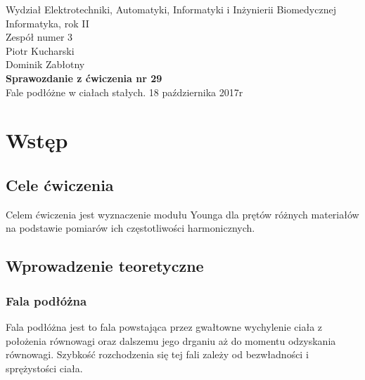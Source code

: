 \documentclass[a4paper,12pts]{article}
\begin{document}
	\thispagestyle{empty}
	\begin{flushleft}
		Wydział Elektrotechniki, Automatyki, Informatyki i Inżynierii Biomedycznej \\
		Informatyka, rok II \\
		Zespół numer 3 \\
		Piotr Kucharski \\
		Dominik Zabłotny \\
		\vspace*{\fill}
		{\large \textbf{Sprawozdanie z ćwiczenia nr 29} } \\
		Fale podłóżne w ciałach stałych.	
		\vfill	
		18 października 2017r
	\end{flushleft}
	
	\newpage
	
	
	\section{Wstęp}
	
	\subsection{Cele ćwiczenia}
	Celem ćwiczenia jest wyznaczenie modułu Younga dla prętów różnych materiałów na podstawie pomiarów ich częstotliwości harmonicznych.
	
	\subsection{Wprowadzenie teoretyczne}
	\subsubsection{Fala podłóżna}
	Fala podłóżna jest to fala powstająca przez gwałtowne wychylenie ciała z położenia równowagi oraz dalszemu jego drganiu aż do momentu odzyskania równowagi. Szybkość rozchodzenia się tej fali zależy od bezwładności i sprężystości ciała.
	
\end{document}

